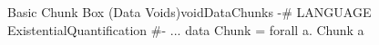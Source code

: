 \begin{pseudohaskell}{Basic Chunk Box (Data Voids)}{voidDataChunks}
{-# LANGUAGE ExistentialQuantification #-}
...
data Chunk = forall a. Chunk a
\end{pseudohaskell}
    